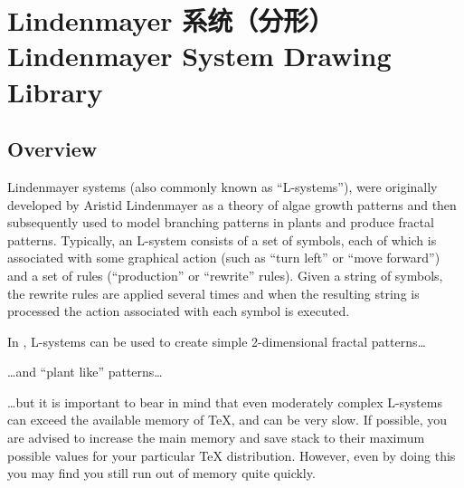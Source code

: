 %
%
%


\section{Lindenmayer 系统（分形） Lindenmayer System Drawing Library}

\subsection{Overview}

Lindenmayer systems (also commonly known as ``L-systems''), were originally
developed by Aristid Lindenmayer as a theory of algae growth patterns and then
subsequently used to model branching patterns in plants and produce fractal
patterns. Typically, an L-system consists of a set of symbols, each of which is
associated with some graphical action (such as ``turn left'' or ``move
forward'') and a set of rules (``production'' or ``rewrite'' rules). Given a
string of symbols, the rewrite rules are applied several times and when the
resulting string is processed the action associated with each symbol is
executed.

In \pgfname, L-systems can be used to create simple 2-dimensional fractal
patterns\ldots
%
\begin{codeexample}[
    preamble={\usetikzlibrary{lindenmayersystems}},
    pre={\expandafter\let\csname pgf@lsystem@Koch curve\endcsname=\relax},
]
\end{codeexample}
%
\noindent\ldots and ``plant like'' patterns\ldots
%
\begin{codeexample}[preamble={\usetikzlibrary{lindenmayersystems}}]
\end{codeexample}
%
\noindent \ldots but it is important to bear in mind that even moderately
complex L-systems can exceed the available memory of \TeX, and can be very
slow. If possible, you are advised to increase the main memory and save stack
to their maximum possible values for your particular \TeX{} distribution.
However, even by doing this you may find you still run out of memory quite
quickly.

